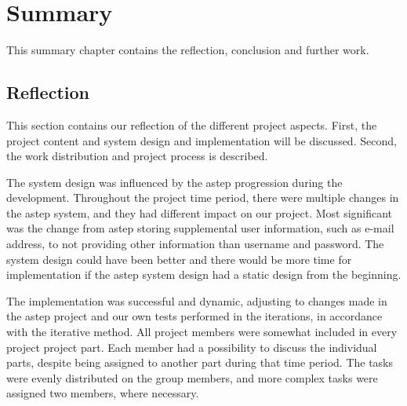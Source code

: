 \chapter{Summary}
This summary chapter contains the reflection, conclusion and further work.

\section{Reflection}
This section contains our reflection of the different project aspects.
First, the project content and system design and implementation will be discussed.
Second, the work distribution and project process is described.

The system design was influenced by the \gls{astep} progression during the development.
Throughout the project time period, there were multiple changes in the \gls{astep} system, and they had different impact on our project.
Most significant was the change from \gls{astep} storing supplemental user information, such as e-mail address, to not providing other information than username and password.
The system design could have been better and there would be more time for implementation if the \gls{astep} system design had a static design from the beginning.

The implementation was successful and dynamic, adjusting to changes made in the \gls{astep} project and our own tests performed in the iterations, in accordance with the iterative method.
All project members were somewhat included in every project project part.
Each member had a possibility to discuss the individual parts, despite being assigned to another part during that time period.
The tasks were evenly distributed on the group members, and more complex tasks were assigned two members, where necessary.


